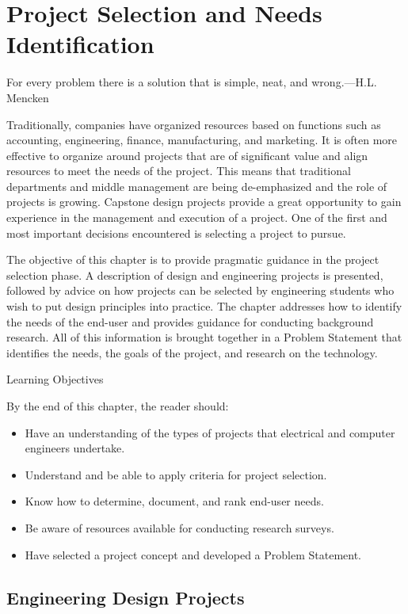 \section{Project Selection and Needs
Identification}\label{project-selection-and-needs-identification}

For every problem there is a solution that is simple, neat, and
wrong.---H.L. Mencken

Traditionally, companies have organized resources based on functions
such as accounting, engineering, finance, manufacturing, and marketing.
It is often more effective to organize around projects that are of
significant value and align resources to meet the needs of the project.
This means that traditional departments and middle management are being
de-emphasized and the role of projects is growing. Capstone design
projects provide a great opportunity to gain experience in the
management and execution of a project. One of the first and most
important decisions encountered is selecting a project to pursue.

The objective of this chapter is to provide pragmatic guidance in the
project selection phase. A description of design and engineering
projects is presented, followed by advice on how projects can be
selected by engineering students who wish to put design principles into
practice. The chapter addresses how to identify the needs of the
end-user and provides guidance for conducting background research. All
of this information is brought together in a Problem Statement that
identifies the needs, the goals of the project, and research on the
technology.

Learning Objectives

By the end of this chapter, the reader should:

\begin{itemize}
\item
  Have an understanding of the types of projects that electrical and
  computer engineers undertake.
\item
  Understand and be able to apply criteria for project selection.
\item
  Know how to determine, document, and rank end-user needs.
\item
  Be aware of resources available for conducting research surveys.
\item
  Have selected a project concept and developed a Problem Statement.
\end{itemize}

\subsection{Engineering Design
Projects}\label{engineering-design-projects}

